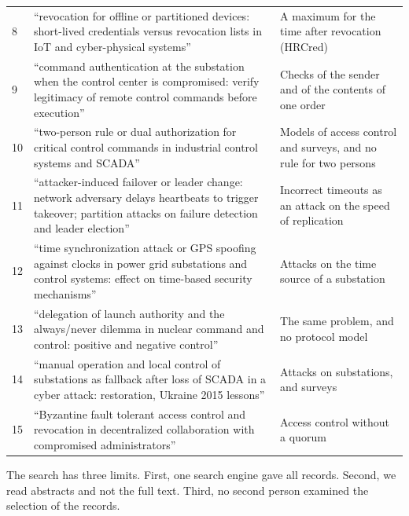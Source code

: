 \begin{table}[t]
\begin{tabularx}{\textwidth}{@{}l>{\raggedright\arraybackslash}p{}>{\raggedright\arraybackslash}X@{}}
8 & ``revocation for offline or partitioned devices: short-lived credentials versus revocation lists in IoT and cyber-physical systems'' & A maximum for the time after revocation (HRCred) \\
9 & ``command authentication at the substation when the control center is compromised: verify legitimacy of remote control commands before execution'' & Checks of the sender and of the contents of one order \\
10 & ``two-person rule or dual authorization for critical control commands in industrial control systems and SCADA'' & Models of access control and surveys, and no rule for two persons \\
11 & ``attacker-induced failover or leader change: network adversary delays heartbeats to trigger takeover; partition attacks on failure detection and leader election'' & Incorrect timeouts as an attack on the speed of replication \\
12 & ``time synchronization attack or GPS spoofing against clocks in power grid substations and control systems: effect on time-based security mechanisms'' & Attacks on the time source of a substation \\
13 & ``delegation of launch authority and the always/never dilemma in nuclear command and control: positive and negative control'' & The same problem, and no protocol model \\
14 & ``manual operation and local control of substations as fallback after loss of SCADA in a cyber attack: restoration, Ukraine 2015 lessons'' & Attacks on substations, and surveys \\
15 & ``Byzantine fault tolerant access control and revocation in decentralized collaboration with compromised administrators'' & Access control without a quorum \\
\bottomrule
\end{tabularx}
\end{table}

The search has three limits. First, one search engine gave all records. Second, we read
abstracts and not the full text. Third, no second person examined the selection of the
records.
